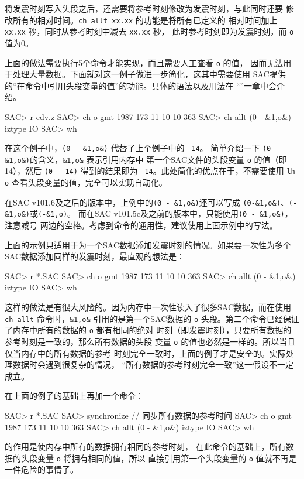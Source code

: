 将发震时刻写入头段之后，还需要将参考时刻修改为发震时刻，与此同时还要
修改所有的相对时间。\texttt{ch allt xx.xx} 的功能是将所有已定义的
相对时间加上 \texttt{xx.xx} 秒，同时从参考时刻中减去 \texttt{xx.xx} 秒，
此时参考时刻即为发震时刻，而 \texttt{o} 值为0。

上面的做法需要执行5个命令才能实现，而且需要人工查看 \texttt{o} 的值，
因而无法用于处理大量数据。下面就对这一例子做进一步简化，这其中需要使用
SAC提供的``在命令中引用头段变量的值''的功能。具体的语法以及用法在
``''一章中会介绍。
\begin{SACCode}
SAC> r cdv.z
SAC> ch o gmt 1987 173 11 10 10 363
SAC> ch allt (0 - &1,o&) iztype IO
SAC> wh
\end{SACCode}
在这个例子中，\verb|(0 - &1,o&)| 代替了上个例子中的 \texttt{-14}。
简单介绍一下 \verb|(0 - &1,o&)|的含义，\verb|&1,o&| 表示引用内存中
第一个SAC文件的头段变量 \texttt{o} 的值（即14），然后 \verb|(0 - 14)|
得到的结果即为 \texttt{-14}。此处简化的优点在于，不需要使用 \texttt{lh o}
查看头段变量的值，完全可以实现自动化。

\begin{note}
在SAC v101.6及之后的版本中，上例中的\verb|(0 - &1,o&)|还可以写成
\verb|(0-&1,o&)|、\verb|(-&1,o&)|或\verb|(-&1,o)|。
而在SAC v101.5c及之前的版本中，只能使用\verb|(0 - &1,o&)|，注意减号
两边的空格。考虑到命令的通用性，建议使用上面示例中的写法。
\end{note}

上面的示例只适用于为一个SAC数据添加发震时刻的情况。如果要一次性为多个
SAC数据添加同样的发震时刻，最直观的想法是：
\begin{SACCode}
SAC> r *.SAC
SAC> ch o gmt 1987 173 11 10 10 363
SAC> ch allt (0 - &1,o&) iztype IO
SAC> wh
\end{SACCode}
这样的做法是有很大风险的。因为内存中一次性读入了很多SAC数据，而在使用
\verb|ch allt| 命令时，\verb|&1,o&| 引用的是第一个SAC数据的 \texttt{o}
头段。第二个命令已经保证了内存中所有的数据的 \texttt{o} 都有相同的绝对
时刻（即发震时刻），只要所有数据的参考时刻是一致的，那么所有数据的头段
变量 \texttt{o} 的值也必然是一样的。所以当且仅当内存中的所有数据的参考
时刻完全一致时，上面的例子才是安全的。实际处理数据时会遇到很复杂的情况，
``所有数据的参考时刻完全一致''这一假设不一定成立。

在上面的例子的基础上再加一个命令：
\begin{SACCode}
SAC> r *.SAC
SAC> synchronize            // 同步所有数据的参考时间
SAC> ch o gmt 1987 173 11 10 10 363
SAC> ch allt (0 - &1,o&) iztype IO
SAC> wh
\end{SACCode}
 的作用是使内存中所有的数据拥有相同的参考时刻，
在此命令的基础上，所有数据的头段变量 \texttt{o} 将拥有相同的值，所以
直接引用第一个头段变量的 \texttt{o} 值就不再是一件危险的事情了。
